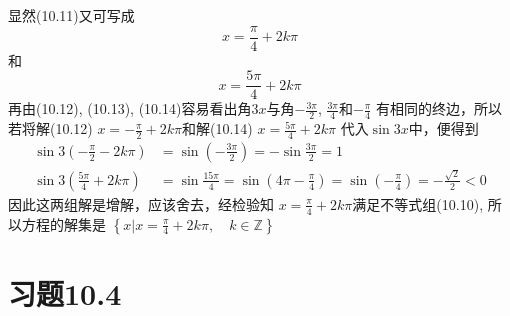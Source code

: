 \begin{solution}
显然(10.11)又可写成
\begin{equation}
  x=\frac{\pi}{4}+2k\pi
\end{equation}
和
\begin{equation}
  x=\frac{5\pi}{4}+2k\pi
\end{equation}
再由(10.12), (10.13), (10.14)容易看出角$3x$与角$-\frac{3\pi}{2}$, $\frac{3\pi}{4}$和$-\frac{\pi}{4}$
有相同的终边，所以若将解(10.12) $x=-\frac{\pi}{2}+2k\pi$和解(10.14) $x=\frac{5\pi}{4}+2k\pi$
代入$\sin3x$中，便得到
\[\begin{split}
  \sin 3\left(-\frac{\pi}{2}-2k\pi\right)&=\sin\left(-\frac{3\pi}{2}\right)=-\sin\frac{3\pi}{2}=1\\
  \sin 3\left(\frac{5\pi}{4}+2k\pi\right)&=\sin\frac{15\pi}{4}=\sin\left(4\pi-\frac{\pi}{4}\right)=\sin\left(-\frac{\pi}{4}\right)=-\frac{\sqrt{2}}{2}<0
\end{split}\]
因此这两组解是增解，应该舍去，经检验知
$x=\frac{\pi}{4}+2k\pi$满足不等式组(10.10),
所以方程的解集是
$\left\{x\Big|x=\frac{\pi}{4}+2k\pi,\quad k\in\mathbb{Z}\right\}$








\end{solution}

\section*{习题10.4}



